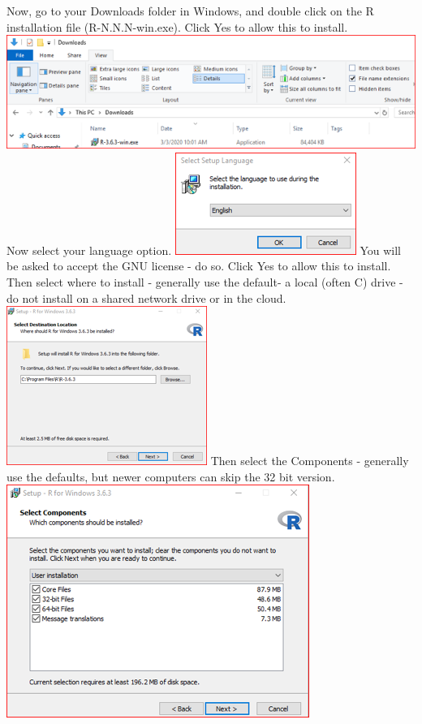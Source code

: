 \documentclass[
]{book}
\begin{document}
Now, go to your Downloads folder in Windows, and double click on the R installation file (R-N.N.N-win.exe). Click Yes to allow this to install.
\includegraphics{images/installrexe.png}
Now select your language option.
\includegraphics{images/installrEnglish.png}
You will be asked to accept the GNU license - do so. Click Yes to allow this to install. Then select where to install - generally use the default- a local (often C) drive - do not install on a shared network drive or in the cloud.
\includegraphics{images/installrdrive.png}
Then select the Components - generally use the defaults, but newer computers can skip the 32 bit version.
\includegraphics{images/installrComponents.png}
\end{document}
